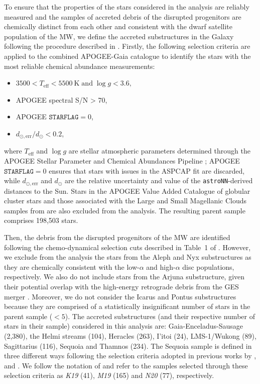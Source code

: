 To ensure that the properties of the stars considered in the analysis are reliably measured and the samples of accreted debris of the disrupted progenitors are chemically distinct from each other and consistent with the dwarf satellite population of the MW, we define the accreted substructures in the Galaxy following the procedure described in \citet{Horta2023}. Firstly, the following selection criteria are applied to the combined APOGEE-Gaia catalogue to identify the stars with the most reliable chemical abundance measurements:

\begin{itemize}
    \item $3500<T_{\mathrm{eff}}<5500~\mathrm{K} \; \mathrm{and} \; \log g<3.6,$
    \item APOGEE spectral S/N > 70,
    \item APOGEE $\mathtt{STARFLAG}=0$,
    \item $d_{\odot,\mathrm{err}}/d_{\odot}<0.2$,
\end{itemize}
where $T_{\mathrm{eff}}$ and $\log g$ are stellar atmospheric parameters determined through the APOGEE Stellar Parameter and Chemical Abundances Pipeline \citep[ASPCAP][]{GarciaPerez2016}; APOGEE $\mathtt{STARFLAG}=0$ ensures that stars with issues in the ASPCAP fit are discarded, while $d_{\odot,\mathrm{err}}$ and $d_{\odot}$ are the relative uncertainty and value of the \texttt{astroNN}-derived distances to the Sun. Stars in the APOGEE Value Added
Catalogue of globular cluster stars \citep{Schiavon2024} and those associated with the Large and Small Magellanic Clouds samples from \citet{Hasselquist2021} are also excluded from the analysis. The resulting parent sample comprises 198,503 stars. 

Then, the debris from the disrupted progenitors of the MW are identified following the chemo-dynamical selection cuts described in Table~1 of \cite{Horta2023}. However, we exclude from the analysis the stars from the Aleph and Nyx substructures as they are chemically consistent with the low-$\alpha$ and high-$\alpha$ disc populations, respectively. We also do not include stars from the Arjuna substructure, given their potential overlap with the high-energy retrograde debris from the GES merger \citep{Naidu2021,Horta2023,Woody2025}. Moreover, we do not consider the Icarus and Pontus substructures because they are comprised of a statistically insignificant number of stars in the parent sample ($<5$). The accreted substructures (and their respective number of stars in their sample) considered in this analysis are: Gaia-Enceladus-Sausage (2,380), the Helmi streams (104), Heracles (263), I'itoi (24), LMS-1/Wukong (89), Sagittarius (116), Sequoia and Thamnos (234).  The Sequoia sample is defined in three different ways following the selection criteria adopted in previous works by \citet{Koppelman2019}, \citet{Myeong2019} and \citet{Naidu2020}. We follow the notation of \cite{Horta2023} and refer to the samples selected through these selection criteria as \textit{K19} (41), \textit{M19} (165) and \textit{N20} (77), respectively. 

